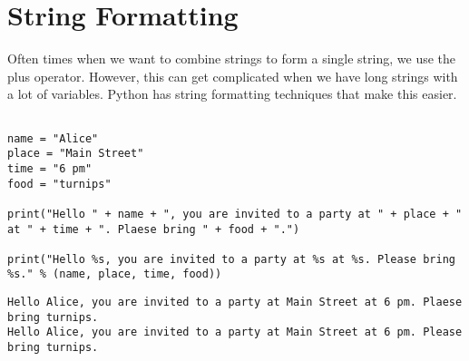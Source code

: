 \documentclass[11pt]{article}
\begin{document}
\section{String Formatting}
\label{sec:org804287b}

Often times when we want to combine strings to form a single string, we use the plus operator. However, this can get complicated when we have long strings with a lot of variables. Python has string formatting techniques that make this easier.

\begin{verbatim}

name = "Alice"
place = "Main Street"
time = "6 pm"
food = "turnips"

print("Hello " + name + ", you are invited to a party at " + place + " at " + time + ". Plaese bring " + food + ".")

print("Hello %s, you are invited to a party at %s at %s. Please bring %s." % (name, place, time, food))

\end{verbatim}

\begin{verbatim}
Hello Alice, you are invited to a party at Main Street at 6 pm. Plaese bring turnips.
Hello Alice, you are invited to a party at Main Street at 6 pm. Please bring turnips.
\end{verbatim}
\end{document}
